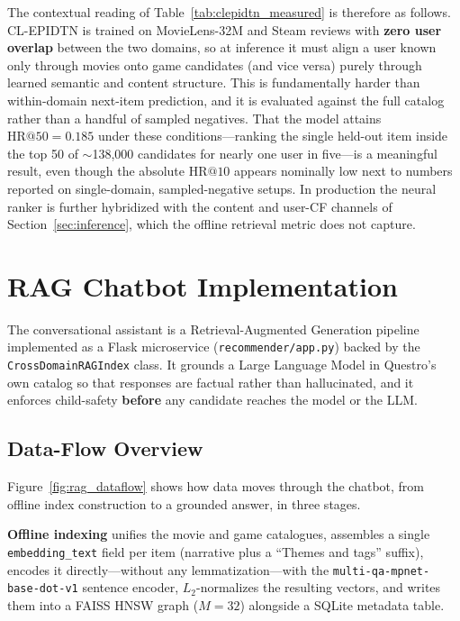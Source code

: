 
The contextual reading of Table~\ref{tab:clepidtn_measured} is therefore as follows. CL-EPIDTN is trained on MovieLens-32M \cite{harper2015movielens} and Steam \cite{steam_site} reviews with \textbf{zero user overlap} between the two domains, so at inference it must align a user known only through movies onto game candidates (and vice versa) purely through learned semantic and content structure. This is fundamentally harder than within-domain next-item prediction, and it is evaluated against the full catalog rather than a handful of sampled negatives. That the model attains $\mathrm{HR}@50 = 0.185$ under these conditions---ranking the single held-out item inside the top 50 of $\sim$138{,}000 candidates for nearly one user in five---is a meaningful result, even though the absolute $\mathrm{HR}@10$ appears nominally low next to numbers reported on single-domain, sampled-negative setups. In production the neural ranker is further hybridized with the content and user-CF channels of Section~\ref{sec:inference}, which the offline retrieval metric does not capture.

\section{RAG Chatbot Implementation}
\label{sec:rag_impl}
The conversational assistant is a Retrieval-Augmented Generation pipeline implemented as a Flask microservice (\texttt{recommender/app.py}) backed by the \texttt{CrossDomainRAGIndex} class. It grounds a Large Language Model in Questro's own catalog so that responses are factual rather than hallucinated, and it enforces child-safety \textbf{before} any candidate reaches the model or the LLM.

\subsection{Data-Flow Overview}
\label{sec:rag_dataflow_sec}
Figure~\ref{fig:rag_dataflow} shows how data moves through the chatbot, from offline index construction to a grounded answer, in three stages.

\textbf{Offline indexing} unifies the movie and game catalogues, assembles a single \texttt{embedding\_text} field per item (narrative plus a ``Themes and tags'' suffix), encodes it directly---without any lemmatization---with the \texttt{multi-qa-mpnet-base-dot-v1} sentence encoder, $L_2$-normalizes the resulting vectors, and writes them into a FAISS HNSW graph ($M=32$) alongside a SQLite metadata table.

